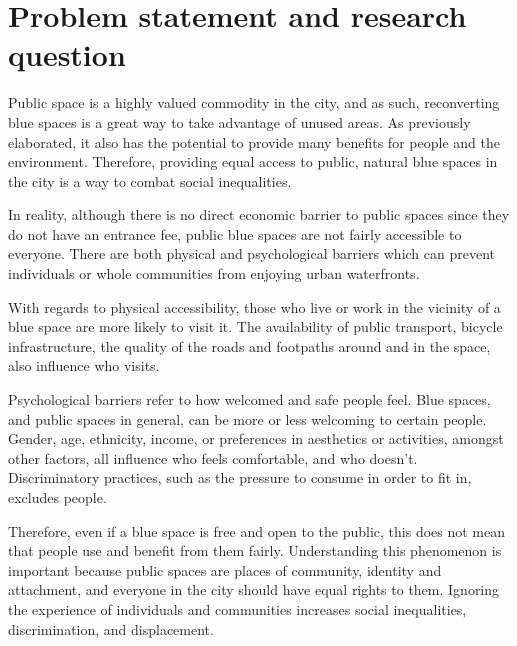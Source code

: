 \documentclass{article}
\begin{document}
\pagebreak
\section{Problem statement and research question}

Public space is a highly valued commodity in the city, and as such, reconverting blue spaces is a great way to take advantage of unused areas. As previously elaborated, it also has the potential to provide many benefits for people and the environment. Therefore, providing equal access to public, natural blue spaces in the city is a way to combat social inequalities.

In reality, although there is no direct economic barrier to public spaces since they do not have an entrance fee, public blue spaces are not fairly accessible to everyone. There are both physical and psychological barriers which can prevent individuals or whole communities from enjoying urban waterfronts.

With regards to physical accessibility, those who live or work in the vicinity of a blue space are more likely to visit it. The availability of public transport, bicycle infrastructure, the quality of the roads and footpaths around and in the space, also influence who visits. 

Psychological barriers refer to how welcomed and safe people feel. Blue spaces, and public spaces in general, can be more or less welcoming to certain people. Gender, age, ethnicity, income, or preferences in aesthetics or activities, amongst other factors, all influence who feels comfortable, and who doesn't. 
Discriminatory practices, such as the pressure to consume in order to fit in, excludes people.

Therefore, even if a blue space is free and open to the public, this does not mean that people use and benefit from them fairly. Understanding this phenomenon is important because public spaces are places of community, identity and attachment, and everyone in the city should have equal rights to them. Ignoring the experience of individuals and communities increases social inequalities, discrimination, and displacement.
\end{document}
